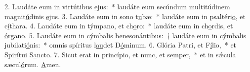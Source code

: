 2. Laudáte eum in virtútibus \uline{e}jus:~* laudáte eum secúndum multitúdinem magnit\uline{ú}dinis \uline{e}jus.
3. Laudáte eum in sono t\uline{u}bæ:~* laudáte eum in psaltéri\uline{o}, et c\uline{í}thara.
4. Laudáte eum in týmpano, et ch\uline{o}ro:~* laudáte eum in ch\uline{o}rdis, et \uline{ó}rgano.
5. Laudáte eum in cýmbalis benesonántibus:~† laudáte eum in cýmbalis jubilati\uline{ó}nis:~* omnis spíritus l\uline{au}det D\uline{ó}minum.
6. Glória Patri, et F\uline{í}lio,~* et Spir\uline{í}tui S\uline{a}ncto.
7. Sicut erat in princípio, et nunc, et s\uline{e}mper,~* et in sǽcula sæcul\uline{ó}rum. \uline{A}men.
